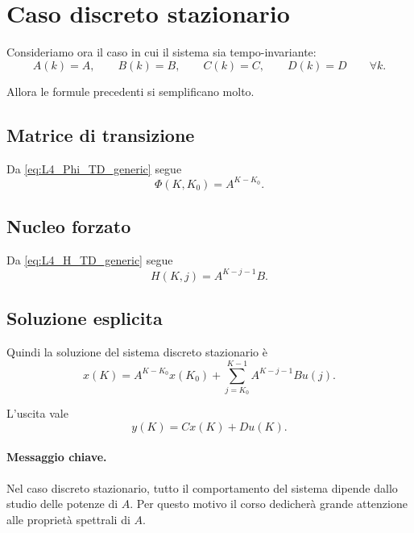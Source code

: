 \section{Caso discreto stazionario}

Consideriamo ora il caso in cui il sistema sia tempo-invariante:
\[
A(k)=A,\qquad B(k)=B,\qquad C(k)=C,\qquad D(k)=D
\qquad \forall k.
\]

Allora le formule precedenti si semplificano molto.

\subsection{Matrice di transizione}

Da \eqref{eq:L4_Phi_TD_generic} segue
\begin{equation}
\Phi(K,K_0)=A^{K-K_0}.
\label{eq:L4_Phi_TD_LTI}
\end{equation}

\subsection{Nucleo forzato}

Da \eqref{eq:L4_H_TD_generic} segue
\begin{equation}
H(K,j)=A^{K-j-1}B.
\label{eq:L4_H_TD_LTI}
\end{equation}

\subsection{Soluzione esplicita}

Quindi la soluzione del sistema discreto stazionario è
\begin{equation}
x(K)=A^{K-K_0}x(K_0)+\sum_{j=K_0}^{K-1}A^{K-j-1}Bu(j).
\label{eq:L4_sol_TD_LTI}
\end{equation}

L'uscita vale
\begin{equation}
y(K)=Cx(K)+Du(K).
\label{eq:L4_out_TD_LTI}
\end{equation}

\paragraph{Messaggio chiave.}
Nel caso discreto stazionario, tutto il comportamento del sistema dipende dallo studio delle potenze di $A$.  
Per questo motivo il corso dedicherà grande attenzione alle proprietà spettrali di $A$.

